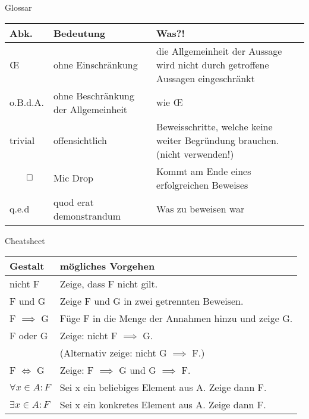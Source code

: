 \begin{frame}[fragile]{Glossar}
	\small
	\begin{tabular}{p{} p{} p{}}
		\toprule
		Abk.&Bedeutung&Was?!\\
		\midrule
		\OE & ohne Einschränkung & die Allgemeinheit der Aussage wird nicht durch getroffene Aussagen eingeschränkt\\
		o.B.d.A. & ohne Beschränkung der Allgemeinheit & wie \OE\\
		trivial&offensichtlich&Beweisschritte, welche keine weiter Begründung brauchen. (nicht verwenden!)\\
		$\qed$&Mic Drop&Kommt am Ende eines erfolgreichen Beweises\\
		q.e.d&quod erat demonstrandum&Was zu beweisen war\\
		\bottomrule
	\end{tabular}
\end{frame}

\begin{frame}[fragile]{Cheatsheet}
	\small
	\begin{tabular}{p{} p{}}
		\toprule
		Gestalt&mögliches Vorgehen\\
		\midrule
		nicht F&Zeige, dass F nicht gilt.\\
		F und G&Zeige F und G in zwei getrennten Beweisen.\\
		F $\implies$ G&Füge F in die Menge der Annahmen hinzu und zeige G.\\
		F oder G&Zeige: nicht F $\implies$ G. \\&(Alternativ zeige: nicht G $\implies$ F.)\\
		F $\iff$ G&Zeige: F $\implies$ G und G $\implies$ F.\\
		$\forall x \in A : F$&Sei x ein beliebiges Element aus A. Zeige dann F.\\
		$\exists x \in A : F$&Sei x ein konkretes Element aus A. Zeige dann F.\\
		\bottomrule
	\end{tabular}
\end{frame}